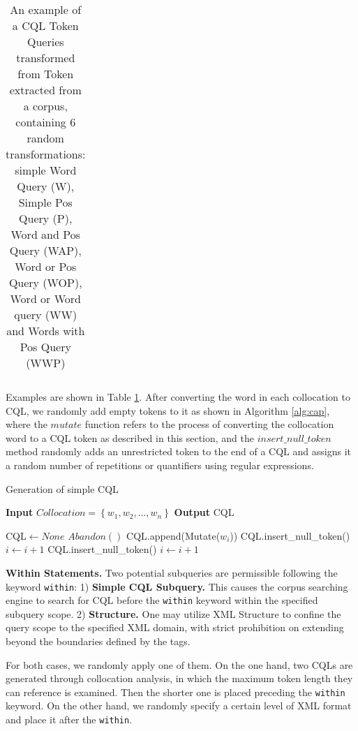 \documentclass[11pt]{article}
\begin{document}
\begin{CJK*}{UTF8}{gbsn}
\begin{table}
\begin{tabular}{p{5em}p{12em}}
    \hline
    \end{tabular}
    \caption{An example of a CQL Token Queries transformed from Token extracted from a corpus, containing 6 random transformations: simple Word Query (W), Simple Pos Query (P), Word and Pos Query (WAP), Word or Pos Query (WOP), Word or Word query (WW) and Words with Pos Query (WWP)}
    \label{tab:simpleTokenExample}
\end{table}

Examples are shown in Table \ref{tab:simpleTokenExample}. After converting the word in each collocation to CQL, we randomly add empty tokens to it as shown in Algorithm \ref{alg:cap}, where the $mutate$ function refers to the process of converting the collocation word to a CQL token as described in this section, and the $insert\_null\_token$ method randomly adds an unrestricted token to the end of a CQL and assigns it a random number of repetitions or quantifiers using regular expressions.



\begin{algorithm}
\caption{Generation of simple CQL}\label{alg:cap}
\begin{algorithmic}
\State \textbf{Input} $Collocation = \left\{ w_1, w_2, \ldots, w_n \right\}$
\State \textbf{Output} CQL

\State CQL$\gets None $ 
    \State $Abandon()$
\Else
    \State CQL.append(Mutate($w_i$))
        \State CQL.insert\_null\_token()
        \State $i \gets i + 1$    
    \Else
            \State CQL.insert\_null\_token()
        \EndIf
    \EndIf
    \State $i \gets i + 1$
\EndIf
\EndWhile
\end{algorithmic}
\end{algorithm}

\textbf{Within Statements. }
Two potential subqueries are permissible following the keyword \verb|within|:
 1) \textbf{Simple CQL Subquery.} This causes the corpus searching engine to search for CQL before the \verb|within| keyword within the specified subquery scope. 
 2) \textbf{Structure.} One may utilize XML Structure to confine the query scope to the specified XML domain, with strict prohibition on extending beyond the boundaries defined by the tags. 

For both cases, we randomly apply one of them. On the one hand, two CQLs are generated through collocation analysis, in which the maximum token length they can reference is examined. Then the shorter one is placed preceding the \verb|within| keyword. On the other hand, we randomly specify a certain level of XML format and place it after the \verb|within|. 


\end{CJK*}
\end{document}
